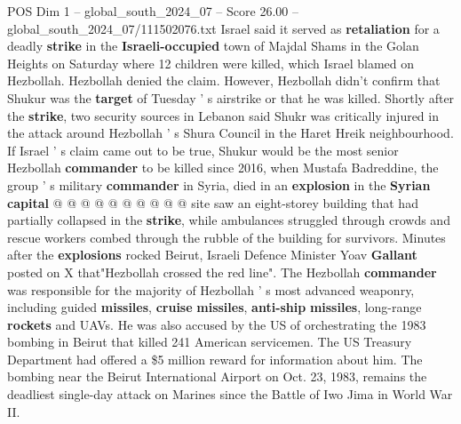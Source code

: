 \begin{textsample}{POS Dim 1 – global\_south\_2024\_07 – Score 26.00 – global\_south\_2024\_07/111502076.txt}
Israel said it served as \textbf{retaliation} for a deadly \textbf{strike} in the \textbf{Israeli-occupied} town of Majdal Shams in the Golan Heights on Saturday where 12 children were killed, which Israel blamed on Hezbollah.
Hezbollah denied the claim.
However, Hezbollah didn't confirm that Shukur was the \textbf{target} of Tuesday ' s airstrike or that he was killed.
Shortly after the \textbf{strike}, two security sources in Lebanon said Shukr was critically injured in the attack around Hezbollah ' s Shura Council in the Haret Hreik neighbourhood.
If Israel ' s claim came out to be true, Shukur would be the most senior Hezbollah \textbf{commander} to be killed since 2016, when Mustafa Badreddine, the group ' s military \textbf{commander} in Syria, died in an \textbf{explosion} in the \textbf{Syrian} \textbf{capital} @ @ @ @ @ @ @ @ @ @ site saw an eight-storey building that had partially collapsed in the \textbf{strike}, while ambulances struggled through crowds and rescue workers combed through the rubble of the building for survivors.
Minutes after the \textbf{explosions} rocked Beirut, Israeli Defence Minister Yoav \textbf{Gallant} posted on X that"Hezbollah crossed the red line".
The Hezbollah \textbf{commander} was responsible for the majority of Hezbollah ' s most advanced weaponry, including guided \textbf{missiles}, \textbf{cruise} \textbf{missiles}, \textbf{anti-ship} \textbf{missiles}, long-range \textbf{rockets} and UAVs.
He was also accused by the US of orchestrating the 1983 bombing in Beirut that killed 241 American servicemen.
The US Treasury Department had offered a \$5 million reward for information about him.
The bombing near the Beirut International Airport on Oct. 23, 1983, remains the deadliest single-day attack on Marines since the Battle of Iwo Jima in World War II.

\end{textsample}

